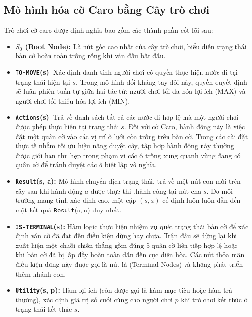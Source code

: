 \subsection{Mô hình hóa cờ Caro bằng Cây trò chơi}

Trò chơi cờ caro được định nghĩa bao gồm các thành phần cốt lõi sau:
\begin{itemize}
	\item \textbf{$S_0$ (Root Node):} Là nút gốc cao nhất của cây trò chơi, biểu diễn trạng thái bàn cờ hoàn toàn trống rỗng khi ván đấu bắt đầu.
	
	\item \textbf{\texttt{TO-MOVE}(s):} Xác định danh tính người chơi có quyền thực hiện nước đi tại trạng thái hiện tại $s$. Trong mô hình đối kháng tay đôi này, quyền quyết định sẽ luân phiên tuần tự giữa hai tác tử: người chơi tối đa hóa lợi ích (MAX) và người chơi tối thiểu hóa lợi ích (MIN). 
	
	\item \textbf{\texttt{Actions}(s):} Trả về danh sách tất cả các nước đi hợp lệ mà một người chơi được phép thực hiện tại trạng thái $s$. Đối với cờ Caro, hành động này là việc đặt một quân cờ vào các vị trí ô lưới còn trống trên bàn cờ. Trong các cài đặt thực tế nhằm tối ưu hiệu năng duyệt cây, tập hợp hành động này thường được giới hạn thu hẹp trong phạm vi các ô trống xung quanh vùng đang có quân cờ để tránh duyệt các ô biệt lập vô nghĩa.
	
	\item \textbf{\texttt{Result}(s, a):} Mô hình chuyển dịch trạng thái, trả về một nút con mới trên cây sau khi hành động $a$ được thực thi thành công tại nút cha $s$. Do môi trường mang tính xác định cao, một cặp $(s, a)$ cố định luôn luôn dẫn đến một kết quả \texttt{Result}(s, a) duy nhất.
	
	\item \textbf{\texttt{IS-TERMINAL}(s):} Hàm logic thực hiện nhiệm vụ quét trạng thái bàn cờ để xác định ván cờ đã đạt đến điều kiện dừng hay chưa. Trận đấu sẽ dừng lại khi xuất hiện một chuỗi chiến thắng gồm đúng 5 quân cờ liên tiếp hợp lệ hoặc khi bàn cờ đã bị lấp đầy hoàn toàn dẫn đến cục diện hòa. Các nút thỏa mãn điều kiện dừng này được gọi là nút lá (Terminal Nodes) và không phát triển thêm nhánh con.
	
	\item \textbf{\texttt{Utility}(s, p):} Hàm lợi ích (còn được gọi là hàm mục tiêu hoặc hàm trả thưởng), xác định giá trị số cuối cùng cho người chơi $p$ khi trò chơi kết thúc ở trạng thái kết thúc $s$.
\end{itemize}

